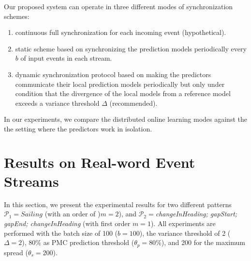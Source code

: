 Our proposed system can operate in three different modes of synchronization schemes: 
\begin{enumerate}[label=(\roman*)] 
	\item continuous full synchronization for each incoming event (hypothetical).
	\item static scheme based on synchronizing the prediction models periodically every $b$ of input events in each stream.
	\item dynamic synchronization protocol based on making the predictors communicate their local prediction models periodically but only under condition that the divergence of the local models from a reference model exceeds a variance threshold $\Delta$ (recommended).  	   
	
\end{enumerate}

In our experiments, we compare the distributed online learning modes against the the setting where the \pmcmr predictors work in isolation. 

\section{Results on Real-word Event Streams}
\label{sec:results_real}

In this section, we present the experimental results for two different patterns  $\mathcal{P}_1=Sailing$ (with an order of )$m=2$), and   $\mathcal{P}_2=$\textit{changeInHeading; gapStart; gapEnd; changeInHeading} (with first order $m=1$). All experiments are performed with the batch size of 100  ($b=100$), the variance threshold of 2 ($\Delta=2$), $80\%$ as PMC prediction threshold ($\theta_{p}=80\%$), and 200 for the maximum spread ($\theta_{s}=200$).

